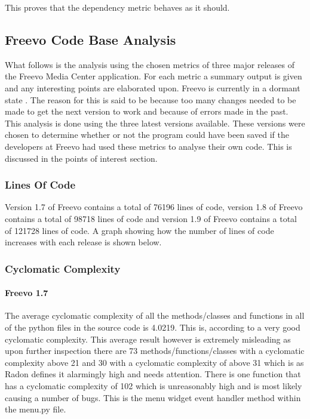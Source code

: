 \documentclass[10.5pt,journal, a4paper]{IEEEtran}
\begin{document}
This proves that the dependency metric behaves as it should. 




\subsection{Freevo Code Base Analysis} 
\noindent
What follows is the analysis using the chosen metrics of three major releases of the Freevo Media Center application. For each metric a summary output is given and any interesting points are elaborated upon. Freevo is currently in a dormant state \cite{Freevo}. The reason for this is said to be because too many changes needed to be made to get the next version to work and because of errors made in the past. This analysis is done using the three latest versions available. These versions were chosen to determine whether or not the program could have been saved if the developers at Freevo had used these metrics to analyse their own code. This is discussed in the points of interest section.  

\subsubsection{Lines Of Code}
\noindent
Version 1.7 of Freevo contains a total of 76196 lines of code, version 1.8 of Freevo contains a total of 98718 lines of code and version 1.9 of Freevo contains a total of 121728 lines of code. A graph showing how the number of lines of code increases with each release is shown below. 



\subsubsection{Cyclomatic Complexity}

\paragraph{Freevo 1.7}
\noindent
The average cyclomatic complexity of all the methods/classes and functions in all of the python files in the source code is 4.0219. This is, according to \cite{mcCabe} a very good cyclomatic complexity. This average result however is extremely misleading as upon further inspection there are 73 methods/functions/classes with a cyclomatic complexity above 21 and 30 with a cyclomatic complexity of above 31 which is as Radon defines it alarmingly high and needs attention. There is one function that has a cyclomatic complexity of 102 which is unreasonably high and is most likely causing a number of bugs. This is the menu widget event handler method within the menu.py file. \\ 
\end{document}

